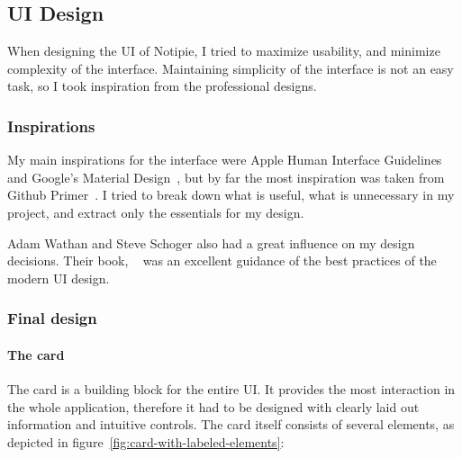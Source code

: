 \subsection{UI Design}\label{sec:ui-design}

When designing the \ac{UI} of Notipie,
I tried to maximize usability,
and minimize complexity of the interface.
Maintaining simplicity of the interface is not an easy task,
so I took inspiration from the professional designs.

\subsubsection{Inspirations}\label{sec:inspirations}

My main inspirations for the interface were
Apple Human Interface Guidelines~\cite{apple_inc_human_2022}
and Google's Material Design~\cite{google_llc_material_2022},
but by far the most inspiration was taken from
Github Primer~\cite{github_inc_primer_2022}.
I tried to break down what is useful,
what is unnecessary in my project,
and extract only the essentials for my design.

Adam Wathan and Steve Schoger
also had a great influence
on my design decisions.
Their book,
~\cite{wathan_refactoring_2018}
was an excellent guidance of the best practices
of the modern \ac{UI} design.

\subsubsection{Final design}\label{sec:final-design}

\paragraph*{The card}\label{par:the-card}

The card is a building block for the entire \ac{UI}.
It provides the most interaction in the whole application,
therefore it had to be designed with clearly laid out information
and intuitive controls.
The card itself consists of several elements,
as depicted in figure~\ref{fig:card-with-labeled-elements}:

